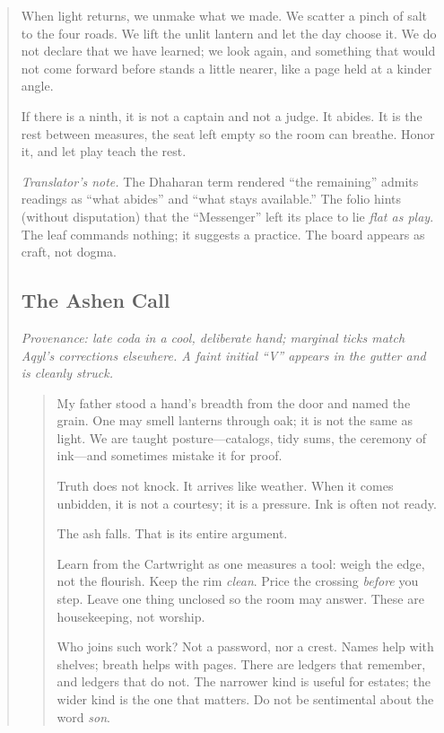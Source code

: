 \documentclass[11pt]{article}
\begin{document}
\begin{itemize}
\begin{quote}
When light returns, we unmake what we made. We scatter a pinch of salt to the four roads. We lift the unlit lantern and let the day choose it. We do not declare that we have learned; we look again, and something that would not come forward before stands a little nearer, like a page held at a kinder angle.

If there is a ninth, it is not a captain and not a judge. It abides. It is the rest between measures, the seat left empty so the room can breathe. Honor it, and let play teach the rest.

\medskip
\noindent\textit{Translator’s note.} The Dhaharan term rendered “the remaining” admits readings as “what abides” and “what stays available.” The folio hints (without disputation) that the “Messenger” left its place to lie \emph{flat as play}. The leaf commands nothing; it suggests a practice. The board appears as craft, not dogma.

\subsection*{The Ashen Call}
\label{epilogue:ashen-call}

\noindent\textit{Provenance: late coda in a cool, deliberate hand; marginal ticks match Aqyl’s corrections elsewhere. A faint initial “V” appears in the gutter and is cleanly struck.}

\medskip
\begin{quote}\small
My father stood a hand’s breadth from the door and named the grain. One may smell lanterns through oak; it is not the same as light. We are taught posture—catalogs, tidy sums, the ceremony of ink—and sometimes mistake it for proof.

Truth does not knock. It arrives like weather. When it comes unbidden, it is not a courtesy; it is a pressure. Ink is often not ready.

The ash falls. That is its entire argument.

Learn from the Cartwright as one measures a tool: weigh the edge, not the flourish. Keep the rim \emph{clean}. Price the crossing \emph{before} you step. Leave one thing unclosed so the room may answer. These are housekeeping, not worship.

Who joins such work? Not a password, nor a crest. Names help with shelves; breath helps with pages. There are ledgers that remember, and ledgers that do not. The narrower kind is useful for estates; the wider kind is the one that matters. Do not be sentimental about the word \emph{son}.


\end{quote}
\end{quote}
\end{itemize}
\end{document}
